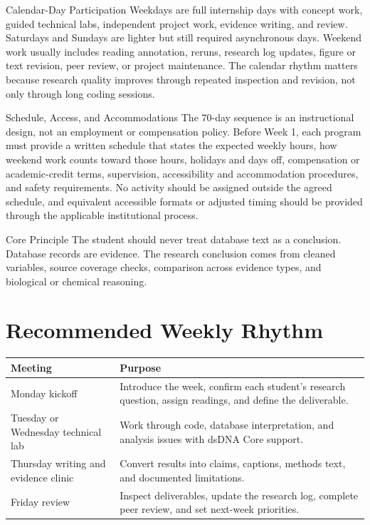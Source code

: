 \begin{programbox}{Calendar-Day Participation}
Weekdays are full internship days with concept work, guided technical labs, independent project work, evidence writing, and review. Saturdays and Sundays are lighter but still required asynchronous days. Weekend work usually includes reading annotation, reruns, research log updates, figure or text revision, peer review, or project maintenance. The calendar rhythm matters because research quality improves through repeated inspection and revision, not only through long coding sessions.
\end{programbox}

\begin{goldbox}{Schedule, Access, and Accommodations}
The 70-day sequence is an instructional design, not an employment or
compensation policy. Before Week 1, each program must provide a written schedule
that states the expected weekly hours, how weekend work counts toward those
hours, holidays and days off, compensation or academic-credit terms,
supervision, accessibility and accommodation procedures, and safety
requirements. No activity should be assigned outside the agreed schedule, and
equivalent accessible formats or adjusted timing should be provided through
the applicable institutional process.
\end{goldbox}

\begin{goldbox}{Core Principle}
The student should never treat database text as a conclusion. Database records are evidence. The research conclusion comes from cleaned variables, source coverage checks, comparison across evidence types, and biological or chemical reasoning.
\end{goldbox}

\section*{Recommended Weekly Rhythm}
\begin{tabularx}{\textwidth}{p{}Y}
\toprule
\textbf{Meeting} & \textbf{Purpose}\\
\midrule
Monday kickoff & Introduce the week, confirm each student's research question, assign readings, and define the deliverable.\\
Tuesday or Wednesday technical lab & Work through code, database interpretation, and analysis issues with dsDNA Core support.\\
Thursday writing and evidence clinic & Convert results into claims, captions, methods text, and documented limitations.\\
Friday review & Inspect deliverables, update the research log, complete peer review, and set next-week priorities.\\
\bottomrule
\end{tabularx}

